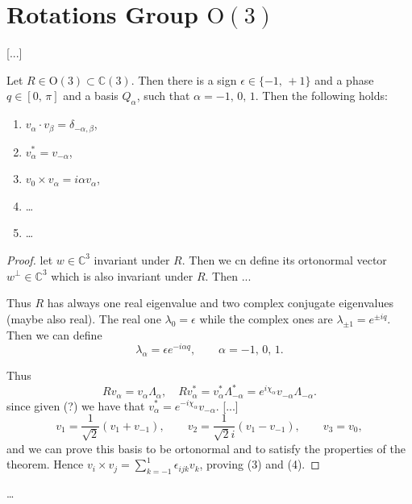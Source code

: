 \section{Rotations Group \(\mathrm{O}(3)\)}

 [...]

\begin{theorem}
    Let \(R \in \mathrm{O}(3) \subset \mathbb{C}(3)\). Then there is a sign \(\epsilon \in \{-1,\,+1\}\) and a phase \(q \in [0,\,\pi]\) and a basis \(Q_{\alpha}\), such that \(\alpha= -1,\,0,\,1\). Then the following holds:
    \begin{enumerate}
        \item \(v_{\alpha} \cdot v_{\beta} = \delta_{-\alpha,\beta}\),
        \item \(v_{\alpha}^* = v_{-\alpha}\),
        \item \(v_0 \times v_{\alpha} = i \alpha v_{\alpha}\),
        \item \dots
        \item \dots
    \end{enumerate}
\end{theorem}

\begin{proof}
    let \(w \in \mathbb{C}^3\) invariant under \(R\). Then we cn define its ortonormal vector \(w^{\bot} \in \mathbb{C}^3\) which is also invariant under \(R\). Then ...

    Thus \(R\) has always one real eigenvalue and two complex conjugate eigenvalues (maybe also real). The real one \(\lambda_0 = \epsilon\) while the complex ones are \(\lambda_{\pm 1} = e^{\pm i q}\). Then we can define
    \[
        \lambda_{\alpha} = \epsilon e^{-i \alpha q}, \qquad \alpha = -1,\,0,\,1.
    \]

    Thus
    \[
        R v_{\alpha} = v_{\alpha} \Lambda_{\alpha}, \quad R v_{\alpha}^* = v_{\alpha}^* \Lambda_{-\alpha}^* =e^{i \chi_\alpha} v_{-\alpha} \Lambda_{-\alpha}.
    \]
    since given (?) we have that \(v_{\alpha}^* = e^{-i \chi_\alpha} v_{-\alpha}\).
        [...]
    \[
        v_1 = \frac{1}{\sqrt{2}}(v_1 + v_{-1}), \qquad v_{2} = \frac{1}{\sqrt{2} i}(v_1 - v_{-1}), \qquad v_3 = v_0,
    \]
    and we can prove this basis to be ortonormal and to satisfy the properties of the theorem. Hence \(v_i \times v_j = \sum_{k=-1}^1 \epsilon_{ijk} v_k\), proving (3) and (4).
\end{proof}

\dots

